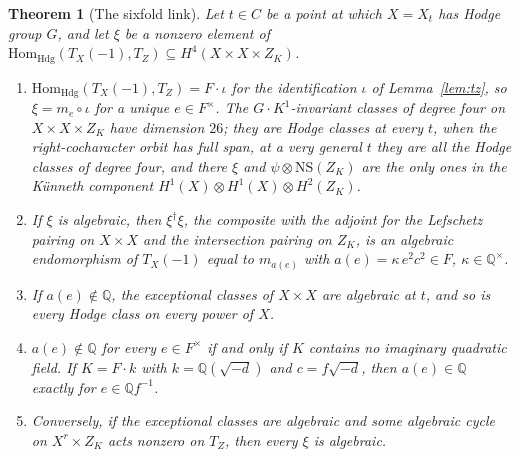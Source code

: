 \documentclass[11pt,reqno]{amsart}
\numberwithin{equation}{section}
\theoremstyle{plain}
\newtheorem{theorem}{Theorem}[section]
\theoremstyle{definition}
\newcommand{\QQ}{\mathbb{Q}}
\newcommand{\Hdg}{\mathrm{Hdg}}
\newcommand{\NS}{\mathrm{NS}}
\newcommand{\Hom}{\mathrm{Hom}}
\begin{document}
\begin{theorem}[The sixfold link]\label{thm:link}
Let $t\in C$ be a point at which $X=X_{t}$ has Hodge group $G$, and let $\xi$ be a nonzero element of $\Hom_{\Hdg}(T_{X}(-1),T_{Z})\subseteq H^{4}(X\times X\times Z_{K})$.
\begin{enumerate}[label=\textup{(\roman*)},leftmargin=2.4em,itemsep=2pt]
\item $\Hom_{\Hdg}(T_{X}(-1),T_{Z})=F\cdot\iota$ for the identification $\iota$ of Lemma~\ref{lem:tz}, so $\xi=m_{e}\circ\iota$ for a unique $e\in F^{\times}$. The $G\cdot K^{1}$-invariant classes of degree four on $X\times X\times Z_{K}$ have dimension $26$; they are Hodge classes at every $t$, when the right-cocharacter orbit has full span, at a very general $t$ they are all the Hodge classes of degree four, and there $\xi$ and $\psi\otimes\NS(Z_{K})$ are the only ones in the K\"unneth component $H^{1}(X)\otimes H^{1}(X)\otimes H^{2}(Z_{K})$.
\item If $\xi$ is algebraic, then $\xi^{\dagger}\xi$, the composite with the adjoint for the Lefschetz pairing on $X\times X$ and the intersection pairing on $Z_{K}$, is an algebraic endomorphism of $T_{X}(-1)$ equal to $m_{a(e)}$ with $a(e)=\kappa\,e^{2}c^{2}\in F$, $\kappa\in\QQ^{\times}$.
\item If $a(e)\notin\QQ$, the exceptional classes of $X\times X$ are algebraic at $t$, and so is every Hodge class on every power of $X$.
\item $a(e)\notin\QQ$ for every $e\in F^{\times}$ if and only if $K$ contains no imaginary quadratic field. If $K=F\cdot k$ with $k=\QQ(\sqrt{-d})$ and $c=f\sqrt{-d}$, then $a(e)\in\QQ$ exactly for $e\in\QQ f^{-1}$.
\item Conversely, if the exceptional classes are algebraic and some algebraic cycle on $X^{r}\times Z_{K}$ acts nonzero on $T_{Z}$, then every $\xi$ is algebraic.
\end{enumerate}
\end{theorem}
\end{document}
